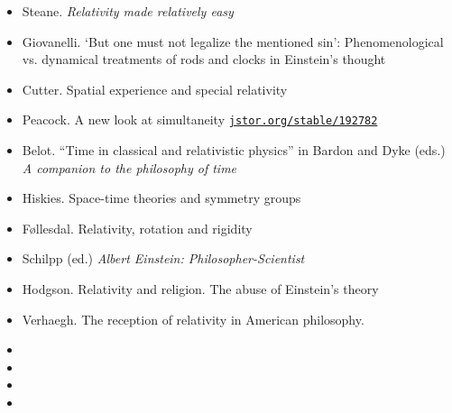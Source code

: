 \documentclass[11pt]{article}
\newcommand\rurl[1]{%
  \href{http://#1}{\nolinkurl{#1}}%
}
\begin{document}
\begin{itemize}
\item Steane. \textit{Relativity made relatively easy}
\item Giovanelli. `But one must not legalize the mentioned sin':
  Phenomenological vs. dynamical treatments of rods and clocks in
  Einstein's thought 
\item Cutter. Spatial experience and special relativity
\item Peacock. A new look at simultaneity
  \rurl{jstor.org/stable/192782}
\item Belot. ``Time in classical and relativistic physics'' in Bardon
  and Dyke (eds.) \textit{A companion to the philosophy of time}
\item Hiskies. Space-time theories and symmetry groups
\item F{\o}llesdal. Relativity, rotation and rigidity
\item Schilpp (ed.) \textit{Albert Einstein: Philosopher-Scientist}
\item Hodgson. Relativity and religion. The abuse of Einstein's theory
\item Verhaegh. The reception of relativity in American
  philosophy. 
\item {}
\item {}
\item {}
\item {}
\end{itemize}




\end{document}
